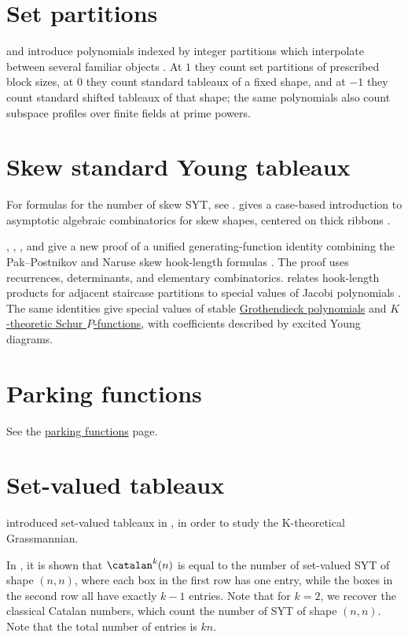\section[setPartitions]{Set partitions}

 and  introduce polynomials indexed
by integer partitions which interpolate between several familiar objects
\cite{PrasadRam2025}.  At $1$ they count set partitions of prescribed block
sizes, at $0$ they count standard tableaux of a fixed shape, and at $-1$ they
count standard shifted tableaux of that shape; the same polynomials also count
subspace profiles over finite fields at prime powers.


\section[skewSYT]{Skew standard Young tableaux}

For formulas for the number of skew SYT, see \cite{MoralesZhu2020x}.
 gives a case-based introduction to asymptotic algebraic
combinatorics for skew shapes, centered on thick ribbons
\cite{Pak2021SkewShapeAsymptotics}.

, ,
, and  give a new proof of a
unified generating-function identity combining the Pak--Postnikov and Naruse
skew hook-length formulas \cite{GrinbergKorniichukMolokanovKhomych2023x}.
The proof uses recurrences, determinants, and elementary combinatorics.
 relates hook-length products for adjacent staircase
partitions to special values of Jacobi polynomials \cite{Shimazaki2026x}.
The same identities give special values of stable
\hyperref[grothendieck]{Grothendieck polynomials} and
\hyperref[schurKP]{$K$-theoretic Schur $P$-functions}, with coefficients
described by excited Young diagrams.


\section[parkingFunctionsBrief]{Parking functions}

See the  \hyperref[parkingFunctions]{parking functions} page.



\section[setValuedTableaux]{Set-valued tableaux}

 introduced set-valued tableaux in \cite{Buch2002},
in order to study the K-theoretical Grassmannian.

In \cite{Drube2018}, it is shown that $\catalan^k(n)$
is equal to the number of set-valued SYT of shape $(n,n)$,
where each box in the first row has one entry, while the boxes in the second row
all have exactly $k-1$ entries. Note that for $k=2$, we recover the classical
Catalan numbers, which count the number of SYT of shape $(n,n)$.
Note that the total number of entries is $kn$.
